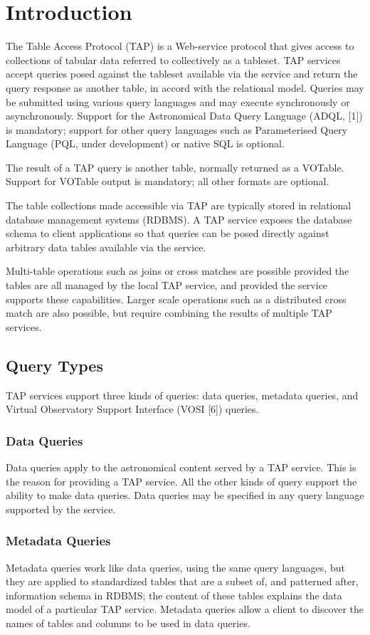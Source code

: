 \documentclass[11pt,a4paper]{ivoa}
\begin{document}
\section{Introduction}
The Table Access Protocol (TAP) is a Web-service protocol that gives access to 
collections of tabular data referred to collectively as a tableset.  TAP 
services accept queries posed against the tableset available via the service and 
return the query response as another table, in accord with the relational model. 
 Queries may be submitted using various query languages and may execute 
synchronously or asynchronously. Support for the Astronomical Data Query 
Language (ADQL, [1]) is mandatory; support for other query languages such as 
Parameterised Query Language (PQL, under development) or native SQL is optional.

The result of a TAP query is another table, normally returned as a VOTable. 
Support for VOTable output is mandatory; all other formats are optional.

The table collections made accessible via TAP are typically stored in relational 
database management systems (RDBMS). A TAP service exposes the database schema 
to client applications so that queries can be posed directly against arbitrary 
data tables available via the service.

Multi-table operations such as joins or cross matches are possible provided the 
tables are all managed by the local TAP service, and provided the service 
supports these capabilities.  Larger scale operations such as a distributed 
cross match are also possible, but require combining the results of multiple TAP 
services.

\subsection{Query Types}
TAP services support three kinds of queries: data queries, metadata queries, and 
Virtual Observatory Support Interface (VOSI [6]) queries.

\subsubsection{Data Queries}
Data queries apply to the astronomical content served by a TAP service. This is 
the reason for providing a TAP service. All the other kinds of query support the 
ability to make data queries. Data queries may be specified in any query 
language supported by the service.

\subsubsection{Metadata Queries}
Metadata queries work like data queries, using the same query languages, but 
they are applied to standardized tables that are a subset of, and patterned 
after, information schema in RDBMS; the content of these tables explains the 
data model of a particular TAP service. Metadata queries allow a client to 
discover the names of tables and columns to be used in data queries.
\end{document}
